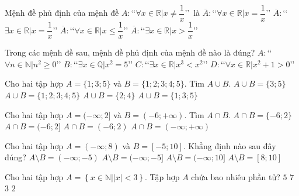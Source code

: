 \begin{ex}%
	Mệnh đề phủ định của mệnh đề $A\colon$\lq\lq $\forall x\in\mathbb{R}| x\ne \dfrac{1}{x}$\rq\rq\, là
	\choice
	{$\overline{A}\colon$\lq\lq $\forall x\in\mathbb{R}| x= \dfrac{1}{x}$\rq\rq}
	{\True $\overline{A}\colon$\lq\lq $\exists x\in\mathbb{R}| x= \dfrac{1}{x}$\rq\rq}
	{$\overline{A}\colon$\lq\lq $\forall x\in\mathbb{R}| x\le \dfrac{1}{x}$\rq\rq}
	{$\overline{A}\colon$\lq\lq $\exists x\in\mathbb{R}| x> \dfrac{1}{x}$\rq\rq}
\end{ex}
\begin{ex}%
	Trong các mệnh đề sau, mệnh đề phủ định của mệnh đề nào là đúng?
	\choice
	{$A\colon$\lq\lq $\forall n\in\mathbb{N}| n^2\ge 0$\rq\rq}
	{\True $B\colon$\lq\lq $\exists x\in\mathbb{Q}| x^2=5$\rq\rq}
	{$C\colon$\lq\lq $\exists x\in\mathbb{R}| x^3<x^2$\rq\rq}
	{$D\colon$\lq\lq $\forall x\in\mathbb{R}| x^2+1>0$\rq\rq}
\end{ex}
\begin{ex}%
	Cho hai tập hợp $A=\{1;3;5\}$ và $B=\{1;2;3;4;5\}$. Tìm $A\cup B$.
	\choice
	{$A\cup B=\{3;5\}$}
	{\True $A\cup B=\{1;2;3;4;5\}$}
	{$A\cup B=\{2;4\}$}
	{$A\cup B=\{1;3;5\}$}
\end{ex}
\begin{ex}%
	Cho hai tập hợp $A=(-\infty;2]$ và $B=(-6;+\infty)$. Tìm $A\cap B$.
	\choice
	{$A\cap B=\{-6;2\}$}
	{\True $A\cap B=(-6;2]$}
	{$A\cap B=(-6;2)$}
	{$A\cap B=(-\infty;+\infty)$}
	\loigiai{
		Ta có $A\cap B=(-6;2]$.
	}
\end{ex}
\begin{ex}%
	Cho hai tập hợp $A=(-\infty;8)$ và $B=[-5;10]$. Khẳng định nào sau đây đúng?
	\choice
	{\True $A\setminus B=(-\infty;-5)$}
	{$A\setminus B=(-\infty;-5]$}
	{$A\setminus B=(-\infty;10]$}
	{$A\setminus B=[8;10]$}
\end{ex}
\begin{ex}%
	Cho hai tập hợp $A=\left\{x\in\mathbb{N}| |x|<3\right\}$. Tập hợp $A$ chứa bao nhiêu phần tử?
	\choice
	{$5$}
	{$7$}
	{\True $3$}
	{$2$}
\end{ex}
